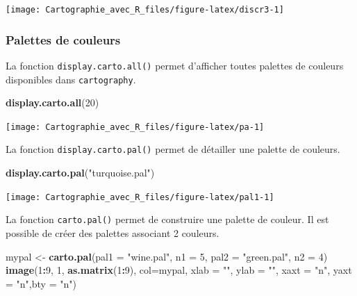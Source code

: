 \documentclass[]{book}
\newenvironment{Shaded}{\begin{snugshade}}{\end{snugshade}}
\newcommand{\KeywordTok}[1]{\textcolor[rgb]{0.13,0.29,0.53}{\textbf{#1}}}
\newcommand{\DataTypeTok}[1]{\textcolor[rgb]{0.13,0.29,0.53}{#1}}
\newcommand{\DecValTok}[1]{\textcolor[rgb]{0.00,0.00,0.81}{#1}}
\newcommand{\StringTok}[1]{\textcolor[rgb]{0.31,0.60,0.02}{#1}}
\newcommand{\OperatorTok}[1]{\textcolor[rgb]{0.81,0.36,0.00}{\textbf{#1}}}
\newcommand{\NormalTok}[1]{#1}
\begin{document}
\begin{center}\texttt{[image: Cartographie\_avec\_R\_files/figure-latex/discr3-1]} \end{center}

\subsubsection{Palettes de couleurs}\label{palettes}

La fonction \texttt{display.carto.all()} permet d'afficher toutes
palettes de couleurs disponibles dans \texttt{cartography}.

\begin{Shaded}
\begin{Highlighting}[]
\KeywordTok{display.carto.all}\NormalTok{(}\DecValTok{20}\NormalTok{)}
\end{Highlighting}
\end{Shaded}

\begin{center}\texttt{[image: Cartographie\_avec\_R\_files/figure-latex/pa-1]} \end{center}

La fonction \texttt{display.carto.pal()} permet de détailler une palette
de couleurs.

\begin{Shaded}
\begin{Highlighting}[]
\KeywordTok{display.carto.pal}\NormalTok{(}\StringTok{"turquoise.pal"}\NormalTok{)}
\end{Highlighting}
\end{Shaded}

\begin{center}\texttt{[image: Cartographie\_avec\_R\_files/figure-latex/pal1-1]} \end{center}

La fonction \texttt{carto.pal()} permet de construire une palette de
couleur. Il est possible de créer des palettes associant 2 couleurs.

\begin{Shaded}
\begin{Highlighting}[]
\NormalTok{mypal <-}\StringTok{ }\KeywordTok{carto.pal}\NormalTok{(}\DataTypeTok{pal1 =} \StringTok{"wine.pal"}\NormalTok{, }\DataTypeTok{n1 =} \DecValTok{5}\NormalTok{, }\DataTypeTok{pal2 =} \StringTok{"green.pal"}\NormalTok{, }\DataTypeTok{n2 =} \DecValTok{4}\NormalTok{)}
\KeywordTok{image}\NormalTok{(}\DecValTok{1}\OperatorTok{:}\DecValTok{9}\NormalTok{, }\DecValTok{1}\NormalTok{, }\KeywordTok{as.matrix}\NormalTok{(}\DecValTok{1}\OperatorTok{:}\DecValTok{9}\NormalTok{), }\DataTypeTok{col=}\NormalTok{mypal, }\DataTypeTok{xlab =} \StringTok{""}\NormalTok{, }\DataTypeTok{ylab =} \StringTok{""}\NormalTok{, }\DataTypeTok{xaxt =} \StringTok{"n"}\NormalTok{, }
      \DataTypeTok{yaxt =} \StringTok{"n"}\NormalTok{,}\DataTypeTok{bty =} \StringTok{"n"}\NormalTok{)}
\end{Highlighting}
\end{Shaded}
\end{document}

